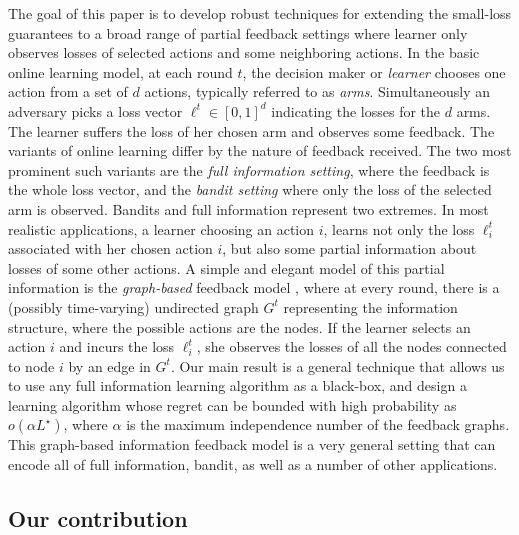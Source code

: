 The goal of this paper is to develop robust techniques for extending the small-loss guarantees to a broad range of partial feedback settings where learner only observes losses of selected actions and some neighboring actions. In the basic online learning model, at each round $t$, the decision maker or \emph{learner} chooses one action from a set of $d$ actions, typically referred to as \emph{arms}. Simultaneously an adversary picks a loss vector $\ell^t\in[0,1]^d$ indicating the losses for the $d$ arms. The learner suffers the loss of her chosen arm and observes some feedback. The variants of online learning differ by the nature of feedback received. The two most prominent such variants are the \emph{full information setting}, where the feedback is the whole loss vector, and the \emph{bandit setting} where only the loss of the selected arm is observed. Bandits and full information represent two extremes. In most realistic applications, a learner  choosing an action $i$, learns not only the loss $\ell_i^t$ associated with her chosen action $i$, but also some partial information about losses of some other actions. A simple and elegant model of this partial information is the \emph{graph-based} feedback model 
\citep{MannorS11,AlonCGMMS}, where at every round, there is a (possibly time-varying) undirected graph $G^t$
representing the information structure, where the possible actions are the nodes. If the learner selects an action $i$ and incurs the loss $\ell_i^t$, she observes the losses of all the nodes connected to node $i$ by an edge in $G^t$. Our main result is a general technique that allows us to use any full information learning algorithm as a black-box, and design a learning algorithm whose regret can be bounded with high probability as $o(\alpha L^{\star})$, where $\alpha$ is the maximum independence number of the feedback graphs. This graph-based information feedback model is a very general setting that can encode all of full information, bandit, as well as a number of other applications. 

\subsection{Our contribution}

